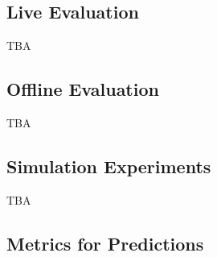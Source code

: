 \subsection{Live Evaluation}
TBA


\subsection{Offline Evaluation}
TBA


\subsection{Simulation Experiments}
TBA











\subsection{Metrics for Predictions}




